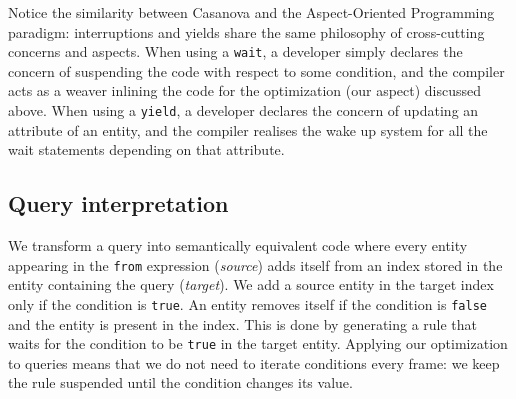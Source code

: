 Notice the similarity between Casanova and the Aspect-Oriented Programming paradigm: interruptions and yields share the same philosophy of cross-cutting concerns and aspects. When using a \texttt{wait}, a developer simply declares the concern of suspending the code with respect to some condition, and the compiler acts as a weaver inlining the code for the optimization (our aspect) discussed above. When using a \texttt{yield}, a developer declares the concern of updating an attribute of an entity, and the compiler realises the wake up system for all the wait statements depending on that attribute.

\subsection{Query interpretation}


We transform a query into semantically equivalent code where every entity appearing in the \texttt{from} expression (\textit{source}) adds itself from an index stored in the entity containing the query (\textit{target}). We add a source entity in the target index only if the condition is \texttt{true}. An entity removes itself if the condition is \texttt{false} and the entity is present in the index. This is done by generating a rule that waits for the condition to be \texttt{true} in the target entity. Applying our optimization to queries means that we do not need to iterate conditions every frame: we keep the rule suspended until the condition changes its value.

